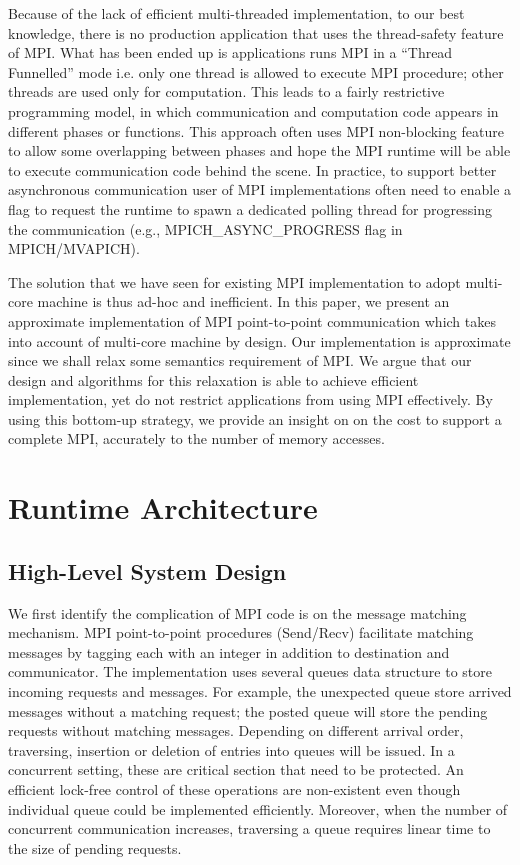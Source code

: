 \documentclass[11pt]{article}
\begin{document}
Because of the lack of efficient multi-threaded implementation, to our best
knowledge, there is no production application that uses the thread-safety
feature of MPI. What has been ended up is applications runs MPI in a ``Thread
Funnelled'' mode i.e. only one thread is allowed to execute MPI procedure;
other threads are used only for computation. This leads to a fairly restrictive
programming model, in which communication and computation code appears in
different phases or functions. This approach often uses MPI non-blocking
feature to allow some overlapping between phases and hope the MPI runtime will
be able to execute communication code behind the scene. In practice, to support
better asynchronous communication user of MPI implementations often need to
enable a flag to request the runtime to spawn a dedicated polling thread for
progressing the communication (e.g., MPICH_ASYNC_PROGRESS flag in
MPICH/MVAPICH).

The solution that we have seen for existing MPI implementation to adopt
multi-core machine is thus ad-hoc and inefficient. In this
paper, we present an approximate implementation of MPI point-to-point
communication which takes into account of multi-core machine by design. Our
implementation is approximate since we shall relax some semantics requirement
of MPI. We argue that our design and algorithms for this relaxation is able to
achieve efficient implementation, yet do not restrict applications from using
MPI effectively. By using this bottom-up strategy, we provide an insight on 
on the cost to support a complete MPI, accurately to the number of memory
accesses.

\section{Runtime Architecture}
\subsection{High-Level System Design}
We first identify the complication of MPI code is on the message matching
mechanism. MPI point-to-point procedures (Send/Recv) facilitate matching
messages by tagging each with an integer in addition to destination and
communicator. The implementation uses several queues data structure to store
incoming requests and messages. For example, the unexpected queue store arrived
messages without a matching request; the posted queue will store the pending
requests without matching messages. Depending on different arrival order,
traversing, insertion or deletion of entries into queues will be issued. In a
concurrent setting, these are critical section that need to be protected. An
efficient lock-free control of these operations are non-existent even though
individual queue could be implemented efficiently.  Moreover, when the number
of concurrent communication increases, traversing a queue requires linear time
to the size of pending requests.
\end{document}
